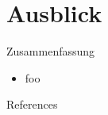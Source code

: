\documentclass[11pt, ngerman, hyperref={unicode}]{beamer}
\theoremstyle{definition} %
\begin{document}
	\section{Ausblick}
	\begin{frame}{Zusammenfassung}
		\begin{itemize}
			\item foo
		\end{itemize}
	\end{frame}

	\begin{frame}[allowframebreaks]{References}
		\printbibliography
	\end{frame}
\end{document}
